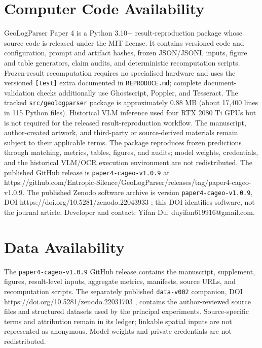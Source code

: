 \documentclass[a4paper,fleqn]{cas-sc}
\begin{document}
\section*{Computer Code Availability}

GeoLogParser Paper 4 is a Python 3.10+ result-reproduction package whose source code is released under the MIT license. It contains versioned code and configuration, prompt and artifact hashes, frozen JSON/JSONL inputs, figure and table generators, claim audits, and deterministic recomputation scripts. Frozen-result recomputation requires no specialised hardware and uses the versioned \texttt{{[}test{]}} extra documented in \texttt{REPRODUCE.md}; complete document-validation checks additionally use Ghostscript, Poppler, and Tesseract. The tracked \texttt{src/geologparser} package is approximately 0.88 MB (about 17,400 lines in 115 Python files). Historical VLM inference used four RTX 2080 Ti GPUs but is not required for the released result-reproduction workflow. The manuscript, author-created artwork, and third-party or source-derived materials remain subject to their applicable terms. The package reproduces frozen predictions through matching, metrics, tables, figures, and audits; model weights, credentials, and the historical VLM/OCR execution environment are not redistributed. The published GitHub release is \texttt{paper4-cageo-v1.0.9} at https://github.com/Entropic-Silence/GeoLogParser/releases/tag/paper4-cageo-v1.0.9. The published Zenodo software archive is version \texttt{paper4-cageo-v1.0.9}, DOI https://doi.org/10.5281/zenodo.22043933 \citep{du2026paper4software}; this DOI identifies software, not the journal article. Developer and contact: Yifan Du, duyifan619916@gmail.com.

\section*{Data Availability}

The \texttt{paper4-cageo-v1.0.9} GitHub release contains the manuscript, supplement, figures, result-level inputs, aggregate metrics, manifests, source URLs, and recomputation scripts. The separately published \texttt{data-v002} companion, DOI https://doi.org/10.5281/zenodo.22031703 \citep{du2026datav002}, contains the author-reviewed source files and structured datasets used by the principal experiments. Source-specific terms and attribution remain in its ledger; linkable spatial inputs are not represented as anonymous. Model weights and private credentials are not redistributed.
\end{document}
